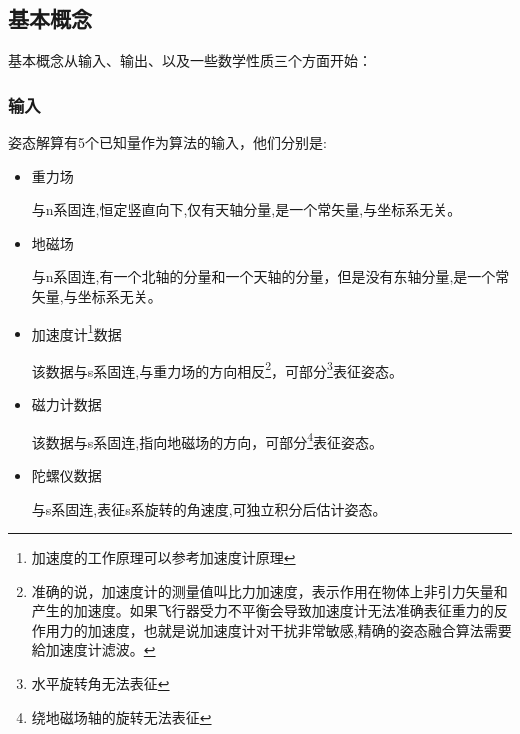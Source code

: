 \subsection{基本概念}
基本概念从输入、输出、以及一些数学性质三个方面开始：
\subsubsection{输入}
姿态解算有5个已知量作为算法的输入，他们分别是:
\begin{itemize}
    \item 重力场

        与n系固连,恒定竖直向下,仅有天轴分量,是一个常矢量,与坐标系无关。
    \item 地磁场

        与n系固连,有一个北轴的分量和一个天轴的分量，但是没有东轴分量,是一个常矢量,与坐标系无关。
    \item 加速度计\footnote{加速度的工作原理可以参考加速度计原理\citep{加速度计原理}}数据

        该数据与s系固连,与重力场的方向相反\footnote{准确的说，加速度计的测量值叫比力加速度，表示作用在物体上非引力矢量和产生的加速度。如果飞行器受力不平衡会导致加速度计无法准确表征重力的反作用力的加速度，也就是说加速度计对干扰非常敏感,精确的姿态融合算法需要給加速度计滤波。}，可部分\footnote{水平旋转角无法表征}表征姿态。
    \item 磁力计数据

        该数据与s系固连,指向地磁场的方向，可部分\footnote{绕地磁场轴的旋转无法表征}表征姿态。
    \item 陀螺仪数据

        与s系固连,表征s系旋转的角速度,可独立积分后估计姿态。
\end{itemize}

